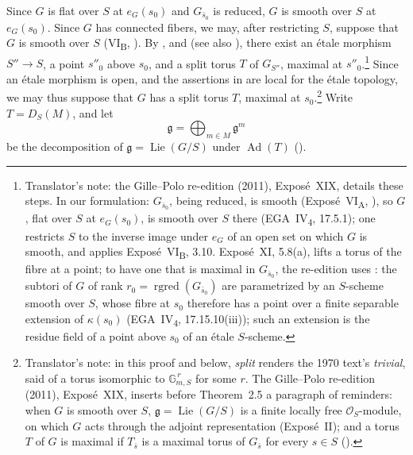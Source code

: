 Since \(G\) is flat over \(S\) at \(e_G(s_0)\) and \(G_{\bar s_0}\) is
reduced, \(G\) is smooth over \(S\) at \(e_G(s_0)\).  Since \(G\) has
connected fibers, we may, after restricting \(S\), suppose that \(G\) is
smooth over \(S\) (VI\textsubscript{B}, ).  By
, and  (see also ),
there exist an étale morphism \(S''\to S\), a point \(s''_0\) above
\(s_0\), and a split torus \(T\) of \(G_{S''}\), maximal at \(s''_0\).\footnote{Translator's note: the Gille--Polo re-edition (2011), Exposé~XIX, details these
steps. In our formulation: \(G_{\bar s_0}\), being reduced, is smooth
(Exposé~VI\textsubscript{A}, ), so \(G\), flat over \(S\) at \(e_G(s_0)\), is
smooth over \(S\) there (EGA~IV\textsubscript{4}, 17.5.1); one restricts \(S\)
to the inverse image under \(e_G\) of an open set on which \(G\) is smooth,
and applies Exposé~VI\textsubscript{B}, 3.10. Exposé~XI, 5.8(a), lifts a torus
of the fibre at a point; to have one that is maximal in \(G_{\bar s_0}\), the
re-edition uses : the subtori of \(G\) of rank
\(r_0=\operatorname{rgred}(G_{\bar s_0})\) are parametrized by an \(S\)-scheme
smooth over \(S\), whose fibre at \(s_0\) therefore has a point over a finite
separable extension of \(\kappa(s_0)\) (EGA~IV\textsubscript{4}, 17.15.10(iii));
such an extension is the residue field of a point above \(s_0\) of an étale
\(S\)-scheme.}
Since an étale morphism is open, and the assertions in
\textup{} are local for the étale topology, we may thus suppose
that \(G\) has a split torus \(T\), maximal at \(s_0\).\footnote{Translator's note: in this proof and below,
\emph{split} renders the 1970 text's \emph{trivial}, said of a torus
isomorphic to \(\mathbb G_{m,S}^{\,r}\) for some \(r\). The Gille--Polo re-edition
(2011), Exposé~XIX, inserts before Theorem~2.5 a paragraph of reminders: when
\(G\) is smooth over \(S\), \(\mathfrak g=\operatorname{Lie}(G/S)\) is a finite
locally free \(\mathcal O_S\)-module, on which \(G\) acts through the adjoint
representation (Exposé~II); and a torus \(T\) of \(G\) is maximal if
\(T_{\bar s}\) is a maximal torus of \(G_{\bar s}\) for every \(s\in S\)
().}  Write
\(T=D_S(M)\), and let
\[
  \mathfrak g=\bigoplus_{m\in M}\mathfrak g^{m}
\]
be the decomposition of
\(\mathfrak g=\operatorname{Lie}(G/S)\) under
\(\operatorname{Ad}(T)\) ().

